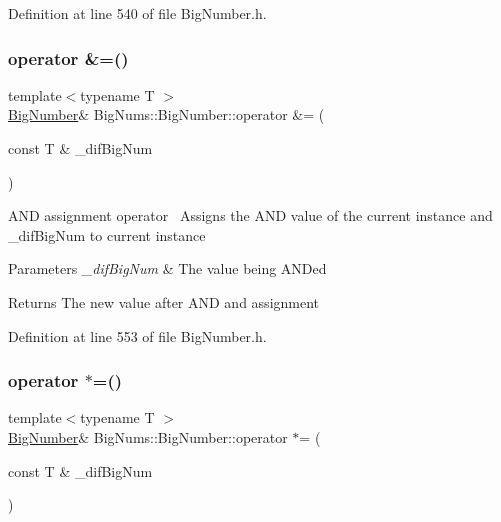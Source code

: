 Definition at line 540 of file Big\+Number.\+h.

\mbox{\label{class_big_nums_1_1_big_number_af98f69c51b85dc6d7af162346d8c40f4}} 
\subsubsection{\texorpdfstring{operator \&=()}{operator \&=()}}
{\footnotesize\ttfamily template$<$typename T $>$ \\
\mbox{\hyperlink{class_big_nums_1_1_big_number}{Big\+Number}}\& Big\+Nums\+::\+Big\+Number\+::operator \&= (\begin{DoxyParamCaption}\item[{const T \&}]{\+\_\+dif\+Big\+Num }\end{DoxyParamCaption})\hspace{0.3cm}{\ttfamily [inline]}}

A\+ND assignment operator~\newline
Assigns the A\+ND value of the current instance and \+\_\+dif\+Big\+Num to current instance 
\begin{DoxyParams}{Parameters}
{\em \+\_\+dif\+Big\+Num} & The value being A\+N\+Ded \\
\hline
\end{DoxyParams}
\begin{DoxyReturn}{Returns}
The new value after A\+ND and assignment 
\end{DoxyReturn}


Definition at line 553 of file Big\+Number.\+h.

\mbox{\label{class_big_nums_1_1_big_number_a1fc741b943e941757495f5fc9663dd45}} 
\subsubsection{\texorpdfstring{operator $\ast$=()}{operator *=()}}
{\footnotesize\ttfamily template$<$typename T $>$ \\
\mbox{\hyperlink{class_big_nums_1_1_big_number}{Big\+Number}}\& Big\+Nums\+::\+Big\+Number\+::operator $\ast$= (\begin{DoxyParamCaption}\item[{const T \&}]{\+\_\+dif\+Big\+Num }\end{DoxyParamCaption})\hspace{0.3cm}{\ttfamily [inline]}}

